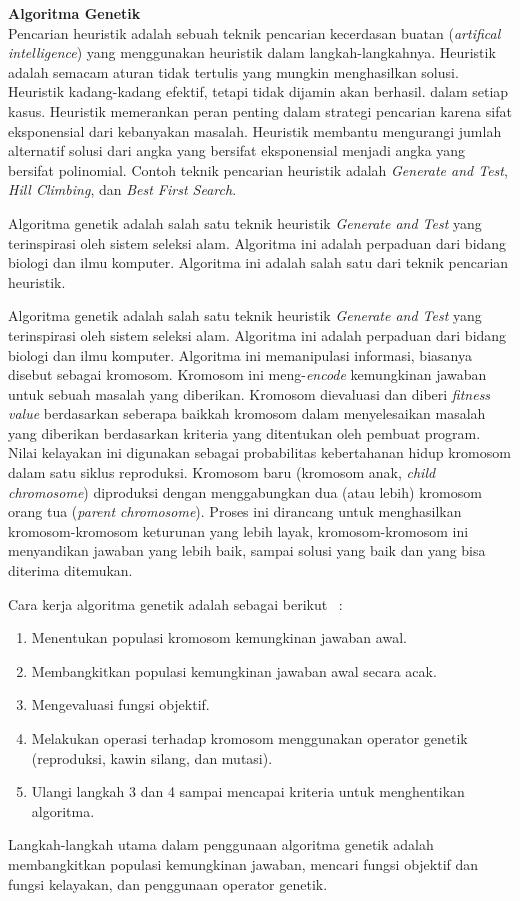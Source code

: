 \documentclass[a4paper,twoside]{article}
\begin{document}
\begin{enumerate}
\textbf{Algoritma Genetik} \\

Pencarian heuristik adalah sebuah teknik pencarian kecerdasan buatan (\textit{artifical intelligence}) yang menggunakan heuristik dalam langkah-langkahnya. Heuristik adalah semacam aturan tidak tertulis yang mungkin menghasilkan solusi. Heuristik kadang-kadang efektif, tetapi tidak dijamin akan berhasil. dalam setiap kasus. Heuristik memerankan peran penting dalam strategi pencarian karena sifat eksponensial dari kebanyakan masalah. Heuristik membantu mengurangi jumlah alternatif solusi dari angka yang bersifat eksponensial menjadi angka yang bersifat polinomial. Contoh teknik pencarian heuristik adalah \textit{Generate and Test}, \textit{Hill Climbing}, dan \textit{Best First Search}.

Algoritma genetik adalah salah satu teknik heuristik \textit{Generate and Test} yang terinspirasi oleh sistem seleksi alam. Algoritma ini adalah perpaduan dari bidang biologi dan ilmu komputer. Algoritma ini adalah salah satu dari teknik pencarian heuristik.

Algoritma genetik adalah salah satu teknik heuristik \textit{Generate and Test} yang terinspirasi oleh sistem seleksi alam. Algoritma ini adalah perpaduan dari bidang biologi dan ilmu komputer. Algoritma ini memanipulasi informasi, biasanya disebut sebagai kromosom. Kromosom ini meng-\textit{encode} kemungkinan jawaban untuk sebuah masalah yang diberikan. Kromosom dievaluasi dan diberi \textit{fitness value} berdasarkan seberapa baikkah kromosom dalam menyelesaikan masalah yang diberikan berdasarkan kriteria yang ditentukan oleh pembuat program. Nilai kelayakan ini digunakan sebagai probabilitas kebertahanan hidup kromosom dalam satu siklus reproduksi. Kromosom baru (kromosom anak, \textit{child chromosome}) diproduksi dengan menggabungkan dua (atau lebih) kromosom orang tua (\textit{parent chromosome}). Proses ini dirancang untuk menghasilkan kromosom-kromosom keturunan yang lebih layak, kromosom-kromosom ini menyandikan jawaban yang lebih baik, sampai solusi yang baik dan yang bisa diterima ditemukan.

Cara kerja algoritma genetik adalah sebagai berikut ~\cite{JohannaLukasSaputra}:
\begin{enumerate}
\item Menentukan populasi kromosom kemungkinan jawaban awal.
\item Membangkitkan populasi kemungkinan jawaban awal secara acak.
\item Mengevaluasi fungsi objektif.
\item Melakukan operasi terhadap kromosom menggunakan operator genetik (reproduksi, kawin silang, dan mutasi).
\item Ulangi langkah 3 dan 4 sampai mencapai kriteria untuk menghentikan algoritma.
\end{enumerate}
Langkah-langkah utama dalam penggunaan algoritma genetik adalah membangkitkan populasi kemungkinan jawaban, mencari fungsi objektif dan fungsi kelayakan, dan penggunaan operator genetik.


\end{enumerate}
\end{document}
